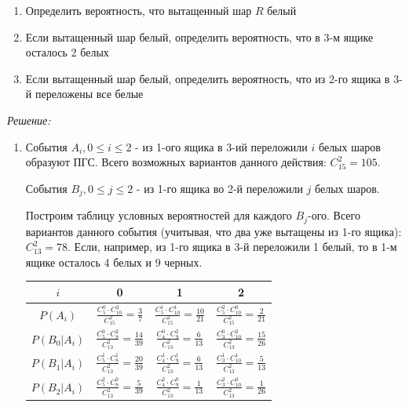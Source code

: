 \begin{enumerate}
	\item Определить вероятность, что вытащенный шар $R$ белый
	\item Если вытащенный шар белый, определить вероятность, что в 3-м ящике осталось 2 белых
	\item Если вытащенный шар белый, определить вероятность, что из 2-го ящика в 3-й переложены все белые
\end{enumerate}

\textit{Решение:}

\begin{enumerate}
\item События $A_i, 0 \le i \le 2$ - из 1-ого ящика в 3-ий переложили $i$ белых шаров образуют ПГС. Всего возможных вариантов данного действия: $C_{15}^2 = 105$.

	События $B_j, 0 \le j \le 2$ - из 1-го ящика во 2-й переложили $j$ белых шаров.
	
	Построим таблицу условных вероятностей для каждого $B_j$-ого. Всего вариантов данного события (учитывая, что два уже вытащены из 1-го ящика): $C_{13}^2 = 78$. Если, например, из 1-го ящика в 3-й переложили 1 белый, то в 1-м ящике осталось 4 белых и 9 черных.
	
	\begin{table}[h]
		\centering
		\begin{tabular}{|c|c|c|c|}
			\hline
			$i$          & 0                                                      & 1                                                       & 2                                                       \\ \hline
			$P(A_i)$     & $\frac{C_5^0 \cdot C_{10}^2}{C_{15}^2} = \frac{3}{7}$  & $\frac{C_5^1 \cdot C_{10}^1}{C_{15}^2} = \frac{10}{21}$ & $\frac{C_5^2 \cdot C_{10}^0}{C_{15}^2} = \frac{2}{21}$  \\ \hline
			$P(B_0|A_i)$ & $\frac{C_5^0 \cdot C_{8}^2}{C_{13}^2} = \frac{14}{39}$ & $\frac{C_4^0 \cdot C_{9}^2}{C_{13}^2} = \frac{6}{13}$   & $\frac{C_3^0 \cdot C_{10}^2}{C_{13}^2} = \frac{15}{26}$ \\ \hline
			$P(B_1|A_i)$ & $\frac{C_5^1 \cdot C_{8}^1}{C_{13}^2} = \frac{20}{39}$ & $\frac{C_4^1 \cdot C_{9}^1}{C_{13}^2} = \frac{6}{13}$   & $\frac{C_3^1 \cdot C_{10}^1}{C_{13}^2} = \frac{5}{13}$  \\ \hline
			$P(B_2|A_i)$ & $\frac{C_5^2 \cdot C_{8}^0}{C_{13}^2} = \frac{5}{39}$  & $\frac{C_4^2 \cdot C_{9}^0}{C_{13}^2} = \frac{1}{13}$   & $\frac{C_3^2 \cdot C_{10}^0}{C_{13}^2} = \frac{1}{26}$  \\ \hline
		\end{tabular}
	\end{table}
	

\end{enumerate}
